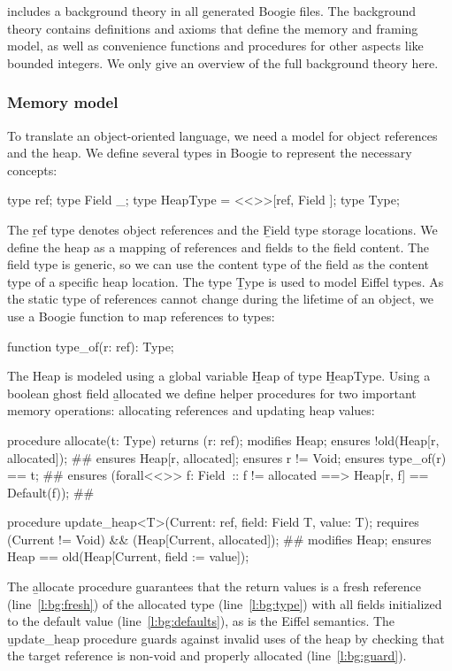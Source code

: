 \AutoProof includes a background theory in all generated Boogie files. The background theory contains definitions and axioms that define the memory and framing model, as well as convenience functions and procedures for other aspects like bounded integers. We only give an overview of the full background theory here.

\subsubsection{Memory model}

To translate an object-oriented language, we need a model for object references and the heap. We define several types in Boogie to represent the necessary concepts:
\begin{brunning}
type ref;
type Field _;
type HeapType = <<\alpha>>[ref, Field \alpha]\alpha;
type Type;
\end{brunning}
The \b{ref} type denotes object references and the \b{Field} type storage locations. We define the heap as a mapping of references and fields to the field content. The field type is generic, so we can use the content type of the field as the content type of a specific heap location. The type \b{Type} is used to model Eiffel types. As the static type of references cannot change during the lifetime of an object, we use a Boogie function to map references to types:
\begin{brunning}
function type_of(r: ref): Type;
\end{brunning}

The Heap is modeled using a global variable \b{Heap} of type \b{HeapType}. Using a boolean ghost field \b{allocated} we define helper procedures for two important memory operations: allocating references and updating heap values:
\begin{brunning}[numbers=left]
procedure allocate(t: Type) returns (r: ref);
  modifies Heap;
  ensures !old(Heap[r, allocated]); #\label{l:bg:fresh}#
  ensures Heap[r, allocated];
  ensures r != Void;
  ensures type_of(r) == t; #\label{l:bg:type}#
  ensures (forall<<\alpha>> f: Field \alpha$\ $:: f != allocated ==> Heap[r, f] == Default(f)); #\label{l:bg:defaults}#
\end{brunning}
\begin{brunning}[numbers=left,firstnumber=last]
procedure update_heap<T>(Current: ref, field: Field T, value: T);
  requires (Current != Void) && (Heap[Current, allocated]); #\label{l:bg:guard}#
  modifies Heap;
  ensures Heap == old(Heap[Current, field := value]);
\end{brunning}
The \b{allocate} procedure guarantees that the return values is a fresh reference (line~\ref{l:bg:fresh}) of the allocated type (line~\ref{l:bg:type}) with all fields initialized to the default value (line~\ref{l:bg:defaults}), as is the Eiffel semantics. The \b{update_heap} procedure guards against invalid uses of the heap by checking that the target reference is non-void and properly allocated (line~\ref{l:bg:guard}).


